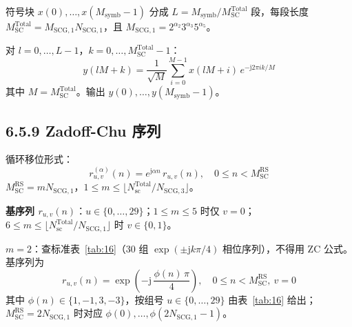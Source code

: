 \documentclass[11pt,a4paper]{ctexart}
\begin{document}
符号块 $x(0),\ldots,x(M_{\mathrm{symb}}-1)$ 分成 $L=M_{\mathrm{symb}}/M_{\mathrm{SC}}^{\mathrm{Total}}$ 段，每段长度 $M_{\mathrm{SC}}^{\mathrm{Total}}=M_{\mathrm{SCG},1} N_{\mathrm{SCG},1}$，且 $M_{\mathrm{SCG},1}=2^{\alpha_2}3^{\alpha_3}5^{\alpha_5}$。

对 $l=0,\ldots,L-1$，$k=0,\ldots,M_{\mathrm{SC}}^{\mathrm{Total}}-1$：
\begin{equation}
  y\!\left(l M + k\right)
  = \frac{1}{\sqrt{M}}
  \sum_{i=0}^{M-1}
  x(l M + i)\,
  e^{-\mathrm{j} 2\pi i k / M}
  \label{eq:scfdma}
\end{equation}
其中 $M=M_{\mathrm{SC}}^{\mathrm{Total}}$。输出 $y(0),\ldots,y(M_{\mathrm{symb}}-1)$。

\subsection{6.5.9 Zadoff-Chu 序列}

循环移位形式：
\begin{equation}
  r_{u,v}^{(\alpha)}(n) = e^{\mathrm{j}\alpha n}\, r_{u,v}(n),\quad 0 \leq n < M_{\mathrm{SC}}^{\mathrm{RS}}
  \label{eq:zc_shift}
\end{equation}
$M_{\mathrm{SC}}^{\mathrm{RS}}=m N_{\mathrm{SCG},1}$，$1 \leq m \leq \lfloor N_{\mathrm{sc}}^{\mathrm{Total}}/N_{\mathrm{SCG},3}\rfloor$。

\textbf{基序列 $r_{u,v}(n)$}：$u\in\{0,\ldots,29\}$；$1\leq m\leq 5$ 时仅 $v=0$；$6\leq m\leq \lfloor N_{\mathrm{sc}}^{\mathrm{Total}}/N_{\mathrm{SCG},1}\rfloor$ 时 $v\in\{0,1\}$。

\textbf{$m=2$}：查标准表~\ref{tab:16}（30 组 $\exp(\pm \mathrm{j}k\pi/4)$ 相位序列），不得用 ZC 公式。基序列为
\begin{equation}
  r_{u,v}(n) = \exp\!\left(-\mathrm{j}\,\frac{\phi(n)\,\pi}{4}\right),\quad
  0 \leq n < M_{\mathrm{SC}}^{\mathrm{RS}},\ v=0
  \label{eq:m2_base}
\end{equation}
其中 $\phi(n)\in\{1,-1,3,-3\}$，按组号 $u\in\{0,\ldots,29\}$ 由表~\ref{tab:16} 给出；$M_{\mathrm{SC}}^{\mathrm{RS}}=2N_{\mathrm{SCG},1}$ 时对应 $\phi(0),\ldots,\phi(2N_{\mathrm{SCG},1}-1)$。
\end{document}
